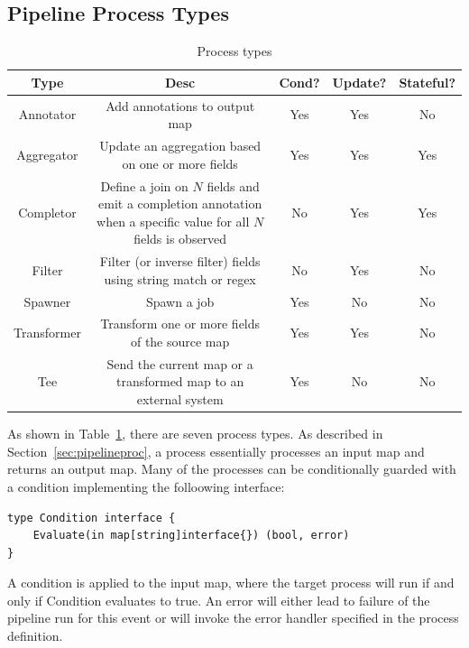 \documentclass[10pt,twocolumn]{article}
\begin{document}
\subsection{Pipeline Process Types}

\begin{table}[t]
\centering
\begin{tabular}{|c|c|c|c|c|}
\hline
{\bfseries Type} & {\bfseries Desc} & {\bfseries Cond?} & {\bfseries Update?} & {\bfseries Stateful?} \\ \hline
Annotator & Add annotations to output map & Yes & Yes & No \\ \hline
Aggregator & Update an aggregation based on one or more fields & Yes & Yes & Yes \\ \hline
Completor & \makecell{Define a join on $N$ fields and emit a completion \\ annotation when a specific value for all $N$ fields is observed} & No & Yes & Yes \\ \hline
Filter & Filter (or inverse filter) fields using string match or regex & No & Yes & No \\ \hline
Spawner & Spawn a job & Yes & No & No \\ \hline
Transformer & Transform one or more fields of the source map & Yes & Yes & No \\ \hline
Tee & Send the current map or a transformed map to an external system & Yes & No & No \\ \hline
\end{tabular}
\caption{Process types}
\label{tab:processtypes}
\end{table}

As shown in Table~\ref{tab:processtypes}, there are seven process types.  As
described in Section~\ref{sec:pipelineproc}, a process essentially processes an
input map and returns an output map.  Many of the processes can be
conditionally guarded with a condition implementing the folloowing interface:

\begin{lstlisting}[linewidth=\columnwidth,breaklines=true]
type Condition interface {
    Evaluate(in map[string]interface{}) (bool, error)
}
\end{lstlisting}

A condition is applied to the input map, where the target process will run if
and only if Condition evaluates to true.  An error will either lead to failure of
the pipeline run for this event or will invoke the error handler specified in the
process definition.
\end{document}

